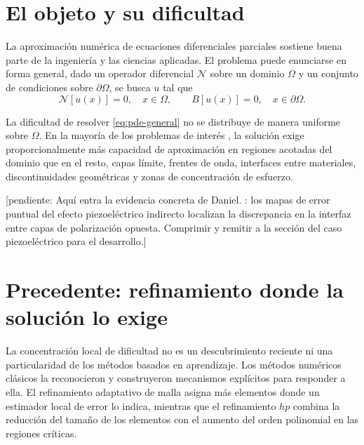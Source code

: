 
\newcommand{\pendiente}[1]{\textcolor{red!70!black}{\textsf{[pendiente: #1]}}}

\newcommand{\dom}{\Omega}
\newcommand{\pde}{\mathcal{N}}
\newcommand{\res}{r}
\newcommand{\sig}{s}
\newcommand{\pesof}{w}
\newcommand{\despl}{\bm{d}}
\newcommand{\potel}{\varphi}
\newcommand{\univ}{\psi}

\label{sec:marco-teorico}


\section{El objeto y su dificultad}

La aproximación numérica de ecuaciones diferenciales parciales sostiene buena parte de la ingeniería y las ciencias aplicadas. El problema puede enunciarse en forma general,  dado un operador diferencial $\pde$ sobre un dominio $\dom$ y un conjunto de condiciones sobre $\partial\dom$, se busca $u$ tal que
\begin{equation}
  \pde[u(x)] = 0, \quad x \in \dom, \qquad
  B[u(x)] = 0, \quad x \in \partial\dom .
\label{eq:pde-general}
\end{equation}


La dificultad de resolver \eqref{eq:pde-general} no se distribuye de manera uniforme sobre $\dom$. En la mayoría de los problemas de interés , la solución exige proporcionalmente más capacidad de aproximación en regiones acotadas del dominio que en el resto, capas límite, frentes de onda, interfaces entre materiales, discontinuidades geométricas y zonas de concentración de esfuerzo.

\pendiente{Aquí entra la evidencia concreta de Daniel. \cite{gonzalez2026pinnpiezo}: los mapas de error puntual del efecto piezoeléctrico indirecto localizan la discrepancia en la interfaz entre capas de polarización opuesta. Comprimir y remitir a la sección del caso piezoeléctrico para el desarrollo.}


\section{Precedente: refinamiento donde la solución lo exige}

La concentración local de dificultad no es un descubrimiento reciente ni una particularidad de los métodos basados en aprendizaje. Los métodos numéricos clásicos la reconocieron y construyeron mecanismos explícitos para responder a ella. El refinamiento adaptativo de malla asigna más elementos donde un estimador local de error lo indica, mientras que el refinamiento $hp$ combina la reducción del tamaño de los elementos con el aumento del orden polinomial en las regiones críticas.

